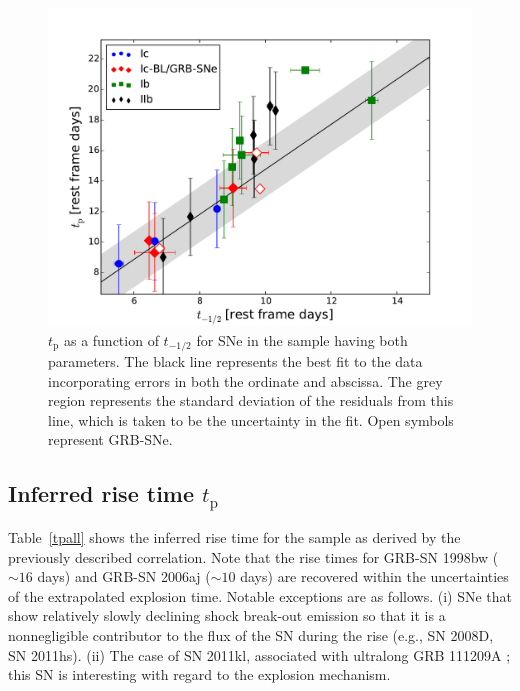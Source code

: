 \documentclass[a4paper,fleqn,usenatbib]{mnras}
\begin{document}
\begin{figure}
\centering
\includegraphics[scale=0.4]{rise-v-tp2.pdf}
\caption{$t_{\mathrm{p}}$ as a function of $t_{-1/2}$ for SNe in the sample having both parameters. The black line represents the best fit to the data incorporating errors in both the ordinate and abscissa. The grey region represents the standard deviation of the residuals from this line, which is taken to be the uncertainty in the fit. Open symbols represent GRB-SNe.}
\label{fig:risetp}
\end{figure}

\subsection{Inferred rise time $t_{\mathrm{p}}$}
Table~\ref{tpall} shows the inferred rise time for the sample as derived by the previously described correlation. Note that the rise times for GRB-SN 1998bw ($\sim 16$ days) and GRB-SN 2006aj ($\sim 10$ days) are recovered within the uncertainties of the extrapolated explosion time. Notable exceptions are as follows. (i) SNe that show relatively slowly declining shock break-out emission so that it is a nonnegligible contributor to the flux of the SN during the rise (e.g., SN 2008D, SN 2011hs). (ii) The case of SN 2011kl, associated with ultralong GRB 111209A \citep{Greiner2015}; this SN is interesting with regard to the explosion mechanism. 
\end{document}
